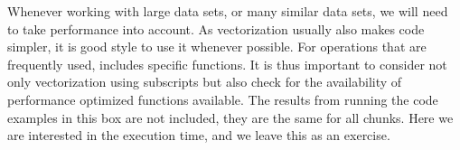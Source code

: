 \documentclass[krantz2]{krantz}\usepackage{knitr}%
\begin{document}
\begin{explainbox}
Whenever working with large data sets, or many similar data sets, we will need to take performance into account. As vectorization usually also makes code simpler, it is good style to use it whenever possible. For operations that are frequently used, \Rlang includes specific functions. It is thus important to consider not only vectorization using subscripts but also check for the availability of performance optimized functions available. The results from running the code examples in this box are not included, they are the same for all chunks. Here we are interested in the execution time, and we leave this as an exercise.

\begin{knitrout}\footnotesize
{}\color{fgcolor}\begin{kframe}
\begin{alltt}
 \hlkwb{<-} \hlstd{(}\hlopt{^}\hlstd{)} 
\end{alltt}
\end{kframe}
\end{knitrout}

\begin{knitrout}\footnotesize
{}\color{fgcolor}\begin{kframe}
\begin{alltt}
 \hlkwb{<-} \hlstd{(}\hlopt{-}\hlstd{)} 
 \hlkwb{<-} 
  \hlopt{<} 
   \hlkwb{<-} \hlopt{^}
   \hlkwb{<-}  \hlopt{+} 
\hlstd{\}}
\end{alltt}
\end{kframe}
\end{knitrout}

\begin{knitrout}\footnotesize
{}\color{fgcolor}\begin{kframe}
\begin{alltt}
 \hlkwb{<-} \hlstd{(}\hlopt{-}\hlstd{)} 
  \hlstd{(} 
   \hlkwb{<-} \hlstd{a[i}\hlopt{+}\hlstd{]} \hlopt{-} 
\hlstd{\}}
\end{alltt}
\end{kframe}
\end{knitrout}


\end{explainbox}
\end{document}
